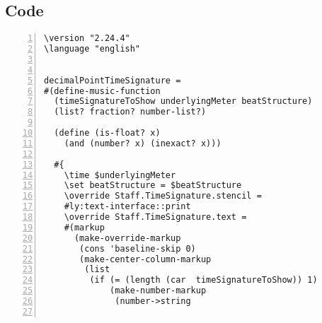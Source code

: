 \subsection{Code}
\begin{Verbatim}[numbers=left,xleftmargin=5mm]
\version "2.24.4"
\language "english"


decimalPointTimeSignature =
#(define-music-function
  (timeSignatureToShow underlyingMeter beatStructure)
  (list? fraction? number-list?)

  (define (is-float? x)
    (and (number? x) (inexact? x)))

  #{
    \time $underlyingMeter
    \set beatStructure = $beatStructure
    \override Staff.TimeSignature.stencil =
    #ly:text-interface::print
    \override Staff.TimeSignature.text =
    #(markup
      (make-override-markup
       (cons 'baseline-skip 0)
       (make-center-column-markup
        (list
         (if (= (length (car  timeSignatureToShow)) 1)
             (make-number-markup
              (number->string


\end{Verbatim}

